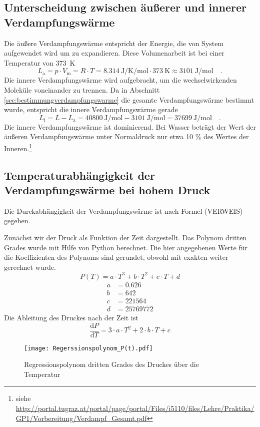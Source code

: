\subsection{Unterscheidung zwischen äußerer und innerer Verdampfungswärme}
Die äußere Verdampfungswärme entspricht der Energie, die von System aufgewendet wird um zu expandieren. Diese Volumenarbeit ist bei einer Temperatur von  \SI{373}{\kelvin}
\begin{equation}
L_\text{a} = p \cdot V_\text{m} = R \cdot T = \SI{8.314}{\joule\per\kelvin\per\mol} \cdot  \SI{373}{\kelvin} \approx \SI{3101}{\joule\per\mol} \quad.
\end{equation}
Die innere Verdampfungswärme wird aufgebracht, um die wechselwirkenden Moleküle voneinander zu trennen. Da in Abschnitt \ref{sec:bestimmungverdampfungswarme} die gesamte Verdampfungswärme bestimmt wurde, entspricht die innere Verdampfungswärme gerade
\begin{equation}
L_\text{i} = L - L_{\text{a}} = \SI{40800}{\joule\per\mol} - \SI{3101}{\joule\per\mol} = \SI{37699}{\joule\per\mol} \quad.
\end{equation}
Die innere Verdampfungswärme ist dominierend. Bei Wasser beträgt der Wert der äußeren Verdampfungswärme unter Normaldruck nur etwa 10 \% des Wertes der Inneren.\footnote{siehe \url{http://portal.tugraz.at/portal/page/portal/Files/i5110/files/Lehre/Praktika/GP1/Vorbereitung/Verdampf_Gesamt.pdf}}




\subsection{Temperaturabhängigkeit der Verdampfungswärme bei hohem Druck}
Die Durckabhängigkeit der Verdampfungswärme ist nach Formel (VERWEIS) gegeben.

Zunächst wir der Druck als Funktion der Zeit dargestellt. Das Polynom dritten Grades wurde mit Hilfe von Python berechnet. Die hier angegebenen Werte für die Koeffizienten des Polynoms sind gerundet, obwohl mit exakten weiter gerechnet wurde.
\begin{equation}
P(T) = a \cdot T ^3 + b \cdot T^2 +c \cdot T + d
\end{equation}
\begin{align}
a &=0.626 \\
b &= 642 \\
c &= 221564 \\
d  &= 25769772
\end{align}
Die Ableitung des Druckes nach der Zeit ist
\begin{equation}
\frac{\text{d} P}{\text{d} T} = 3 \cdot a \cdot T^2 + 2 \cdot b \cdot T + c
\end{equation}
\begin{figure}[h!]
	\centering
	\texttt{[image: Regerssionspolynom\_P(t).pdf]}
	\caption{Regressionspolynom dritten Grades des Druckes über die Temperatur}
	\label{fig:Regerssionspolynom_P(t)}
\end{figure}

